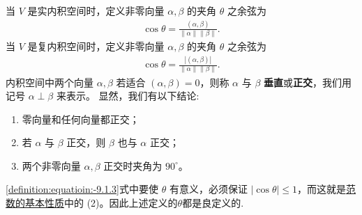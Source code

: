 \documentclass[../../main.tex]{subfiles}
\begin{document}
\begin{definition}[向量的夹角]
当 \(V\) 是实内积空间时，定义非零向量 \(\alpha,\beta\) 的夹角 \(\theta\) 之余弦为
\begin{align}
\cos\theta=\frac{(\alpha,\beta)}{\|\alpha\|\|\beta\|}.\label{definition:equatioin:-9.1.3}
\end{align}
当 \(V\) 是复内积空间时，定义非零向量 \(\alpha,\beta\) 的夹角 \(\theta\) 之余弦为
\begin{align*}
\cos\theta=\frac{|(\alpha,\beta)|}{\|\alpha\|\|\beta\|}.
\end{align*}
内积空间中两个向量 \(\alpha,\beta\) 若适合 \((\alpha,\beta)=0\)，则称 \(\alpha\) 与 \(\beta\) \textbf{垂直}或\textbf{正交}，我们用记号 \(\alpha\perp\beta\) 来表示。
显然，我们有以下结论:
\begin{enumerate}
\item 零向量和任何向量都正交；

\item 若 \(\alpha\) 与 \(\beta\) 正交，则 \(\beta\) 也与 \(\alpha\) 正交；

\item 两个非零向量 \(\alpha,\beta\) 正交时夹角为 \(90^{\circ}\)。
\end{enumerate}
\end{definition}
\begin{remark}
\eqref{definition:equatioin:-9.1.3}式中要使 \(\theta\) 有意义，必须保证 \(|\cos\theta|\leqslant 1\)，而这就是\hyperref[theorem:范数的基本性质]{范数的基本性质}中的 (2)。因此上述定义的$\theta$都是良定义的.
\end{remark}
\end{document}

